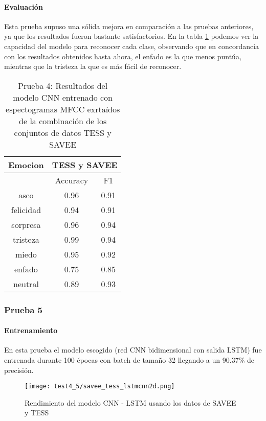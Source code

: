 \documentclass[11pt,a4paper,spanish]{book}
\begin{document}
	\paragraph{Evaluación}
	Esta prueba supuso una sólida mejora en comparación a las pruebas anteriores, ya que los resultados fueron bastante satisfactorios. En la tabla \ref{result_Test4} podemos ver la capacidad del modelo para reconocer cada clase, observando que en concordancia con los resultados obtenidos hasta ahora, el enfado es la que menos puntúa, mientras que la tristeza la que es más fácil de reconocer.
	\begin{table}[H]
		\centering
		\begin{center}
			\begin{tabular}{| c|| c c | }
				\hline
				\multicolumn{1}{|c||}{Emocion} & 
				\multicolumn{2}{|c|}{TESS y SAVEE} \\
				\hline
				& 
				\multicolumn{1}{|c|}{Accuracy}&\multicolumn{1}{|c|}{F1}\\
				\hline
				asco 		&  0.96 &  0.91 \\
				felicidad 	&  0.94 &  0.91 \\
				sorpresa 	&  0.96 &  0.94 \\
				tristeza 	&  0.99 &  0.94 \\
				miedo 		&  0.95 &  0.92 \\
				enfado 		&  0.75 &  0.85 \\
				neutral 	&  0.89 &  0.93 \\
				\hline
			\end{tabular}
			
			\caption{Prueba 4: Resultados del modelo CNN entrenado con espectogramas MFCC exrtaídos de la combinación de los conjuntos de datos TESS y SAVEE}
			\label{result_Test4}
		\end{center}
	\end{table}
	
	\subsubsection{Prueba 5}
	\paragraph{Entrenamiento}
	En esta prueba el modelo escogido (red CNN bidimensional con salida LSTM) fue entrenada durante 100 épocas con batch de tamaño 32 llegando a un 90.37\% de precisión. 
	\begin{figure}[H]
		\centering
		\texttt{[image: test4\_5/savee\_tess\_lstmcnn2d.png]} 
		\caption{Rendimiento del modelo CNN - LSTM usando los datos de SAVEE y TESS}
		\label{fig:lstm-cnn}
	\end{figure}
\end{document}
